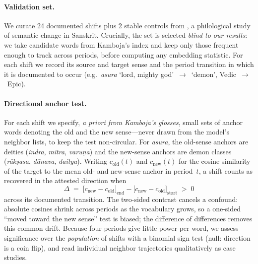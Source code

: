 \paragraph{Validation set.}
We curate 24 documented shifts plus 2 stable controls from \citet{kamboja}, a philological study
of semantic change in Sanskrit. Crucially, the set is selected \emph{blind to our results}: we
take candidate words from Kamboja's index and keep only those frequent enough to track across
periods, before computing any embedding statistic. For each shift we record its source and target
sense and the period transition in which it is documented to occur (e.g.\ \textit{asura}
`lord, mighty god'~$\rightarrow$~`demon', Vedic~$\rightarrow$~Epic).

\paragraph{Directional anchor test.}
For each shift we specify, \emph{a priori from Kamboja's glosses}, small sets of anchor words
denoting the old and the new sense---never drawn from the model's neighbor lists, to keep the
test non-circular. For \textit{asura}, the old-sense anchors are deities (\textit{indra},
\textit{mitra}, \textit{varu\d{n}a}) and the new-sense anchors are demon classes
(\textit{r\=ak\d{s}asa}, \textit{d\=anava}, \textit{daitya}). Writing $c_{\text{old}}(t)$ and
$c_{\text{new}}(t)$ for the cosine similarity of the target to the mean old- and new-sense
anchor in period~$t$, a shift counts as recovered in the attested direction when
\[
\Delta \;=\; \bigl[c_{\text{new}}-c_{\text{old}}\bigr]_{\text{end}}
            -\bigl[c_{\text{new}}-c_{\text{old}}\bigr]_{\text{start}} \;>\; 0
\]
across its documented transition. The two-sided contrast cancels a confound: absolute cosines
shrink across periods as the vocabulary grows, so a one-sided ``moved toward the new sense''
test is biased; the difference of differences removes this common drift. Because four periods
give little power per word, we assess significance over the \emph{population} of shifts with a
binomial sign test (null: direction is a coin flip), and read individual neighbor trajectories
qualitatively as case studies.

